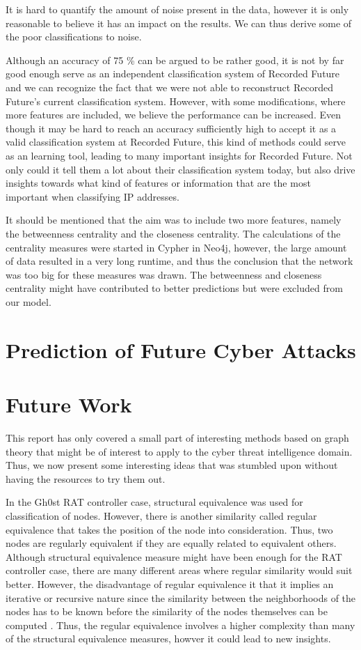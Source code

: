 It is hard to quantify the amount of noise present in the data, however it is only reasonable to believe it has an impact on the results. We can thus derive some of the poor classifications to noise. 

Although an accuracy of 75 \% can be argued to be rather good, it is not by far good enough serve as an independent classification system of Recorded Future and we can recognize the fact that we were not able to reconstruct Recorded Future's current classification system. However, with some modifications, where more features are included, we believe the performance can be increased. Even though it may be hard to reach an accuracy sufficiently high to accept it as a valid classification system at Recorded Future, this kind of methods could serve as an learning tool, leading to many important insights for Recorded Future. Not only could it tell them a lot about their classification system today, but also drive insights towards what kind of features or information that are the most important when classifying IP addresses.

It should be mentioned that the aim was to include two more features, namely the betweenness centrality and the closeness centrality. The calculations of the centrality measures were started in Cypher in Neo4j, however, the large amount of data resulted in a very long runtime, and thus the conclusion that the network was too big for these measures was drawn. The betweenness and closeness centrality might have contributed to better predictions but were excluded from our model.

\section{Prediction of Future Cyber Attacks}


\section{Future Work}
This report has only covered a small part of interesting methods based on graph theory that might be of interest to apply to the cyber threat intelligence domain. Thus, we now present some interesting ideas that was stumbled upon without having the resources to try them out. 

In the Gh0st RAT controller case, structural equivalence was used for classification of nodes. However, there is another similarity called regular equivalence that takes the position of the node into consideration. Thus, two nodes are regularly equivalent if they are equally related to equivalent others. Although structural equivalence measure might have been enough for the RAT controller case, there are many different areas where regular similarity would suit better. However, the disadvantage of regular equivalence it that it implies an iterative or recursive nature since the similarity between the neighborhoods of the nodes has to be known before the similarity of the nodes themselves can be computed \cite{leicht2006}. Thus, the regular equivalence involves a higher complexity than many of the structural equivalence measures, howver it could lead to new insights. 

